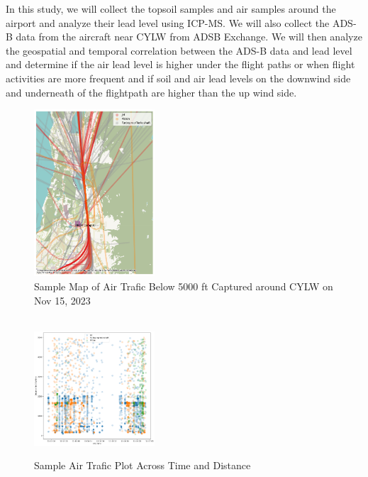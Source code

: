 \documentclass[12pt]{article}
\begin{document}
In this study, we will collect the topsoil samples and air samples around the airport and analyze their lead level using ICP-MS. We will also collect the ADS-B data from the aircraft near CYLW from ADSB Exchange\cite{adsbexchange}. We will then analyze the geospatial and temporal correlation between the ADS-B data and lead level and determine if the air lead level is higher under the flight paths or when flight activities are more frequent and if soil and air lead levels on the downwind side and underneath of the flightpath are higher than the up wind side. 
\setlength\intextsep{-2pt}
\begin{figure}
  \begin{center}
    \includegraphics[width=0.4\textwidth]{map.png} \\
  \caption{\small{Sample Map of Air Trafic Below 5000 ft Captured around CYLW on Nov 15, 2023}}
      \label{fig:map}\\

          \includegraphics[width=0.4\textwidth]{time.png} \\
  \caption{\small{Sample Air Trafic Plot Across Time and Distance}}
      \label{fig:time}
  \end{center}
\vspace{-20pt}
\end{figure}
\end{document}
